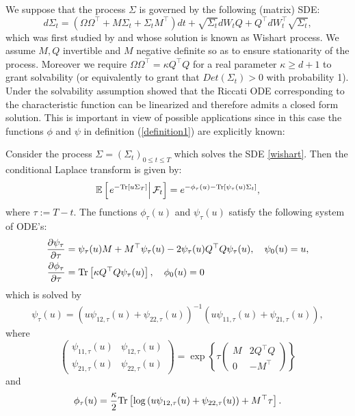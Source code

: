 We suppose that the process $\Sigma$ is governed by the following (matrix) SDE:
\begin{equation}
d\Sigma_t=(\Omega\Omega^{\top}+M\Sigma_t+\Sigma_tM^{\top})dt+\sqrt{\Sigma_t}dW_tQ+Q^{\top}dW_t^{\top}\sqrt{\Sigma_t},\label{wishart}
\end{equation}
which was first studied by \cite{article_Bru} and whose solution is known as Wishart process. We assume $M,Q$ invertible and $M$ negative definite so as to ensure stationarity of the process. Moreover we require $\Omega\Omega^{\top}=\kappa Q^{\top}Q$ for a real parameter $\kappa \geq d+1$ to grant solvability (or equivalently to grant that $Det(\Sigma_t)>0$ with probability 1). Under the solvability assumption \cite{article_Grasselli} showed that the Riccati ODE corresponding to the characteristic function can be linearized and therefore admits a closed form solution. This is important in view of possible applications since in this case the functions $\phi$ and $\psi$ in definition (\ref{definition1}) are explicitly known:
\begin{proposition}
Consider the process $\Sigma=\left(\Sigma_t\right)_{0\leq t\leq T}$ which solves the SDE \eqref{wishart}. Then the conditional Laplace transform is given by:
\begin{align}
\mathbb{E}\left[\left.e^{-\textup{Tr}\left[u\Sigma_T\right]}\right|\mathcal{F}_t\right]=e^{-\phi_\tau(u)-\textup{Tr}\left[\psi_\tau(u)\Sigma_t\right]},
\end{align}
where $\tau:=T-t$. The functions $\phi_\tau(u)$ and $\psi_\tau(u)$ satisfy the following system of ODE's:
\begin{align}
\frac{\partial \psi_{\tau}}{\partial \tau}&=\psi_\tau(u) M+M^\top \psi_\tau(u)-2\psi_\tau(u) Q^\top Q\psi_\tau(u),\quad\psi_0(u)=u,\label{Riccati_psi}\\
\frac{\partial \phi_{\tau}}{\partial \tau}&=\textup{Tr}\left[\kappa Q^{\top}Q\psi_\tau(u)\right],\quad\phi_0(u)=0\label{Riccati_phi}
\end{align}
which is solved by
\begin{align}
\psi_{\tau}(u)=\label{clever2}\left(u\psi_{12,\tau}(u)+\psi_{22,\tau}(u) \right)^{-1}\left(u\psi_{11,\tau}(u)+\psi_{21,\tau}(u)\right), 
\end{align}
where
\begin{equation}
\left(\begin{array}{rr}
\psi_{11,\tau}(u) & \psi_{12,\tau}(u)\\
\psi_{21,\tau}(u) & \psi_{22,\tau}(u)
\end{array}\right)
=\exp\left\{ \tau \left( 
\begin{array}{rr}
M & 2Q^{\top}Q\\
0 & -M^{\top}
\end{array}
\right) \right\}
\end{equation} 
and
\begin{equation}
\phi_{\tau}(u)=\frac{\kappa}{2}\textup{Tr}\left[\log\left(u\psi_{12,\tau}(u)+\psi_{22,\tau}(u) \right)+M^{\top}\tau \right].
\end{equation}
\label{proplinearization}\end{proposition}
